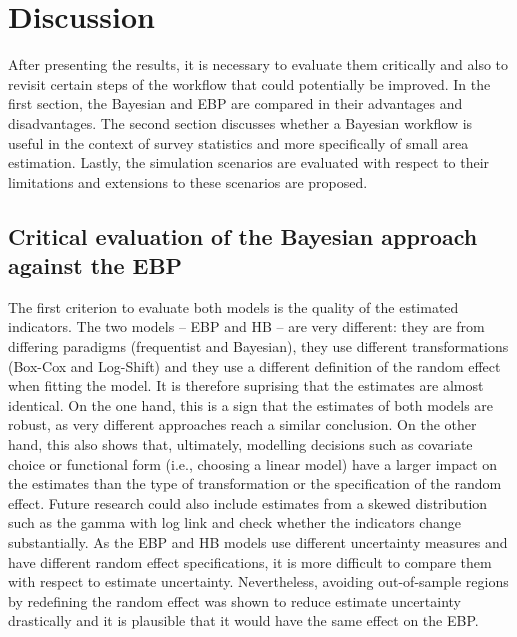 \chapter{Discussion}

After presenting the results, it is necessary to evaluate them critically and also to revisit certain steps of the workflow that could potentially be improved.
In the first section, the Bayesian and EBP are compared in their advantages and disadvantages.
The second section discusses whether a Bayesian workflow is useful in the context of survey statistics and more specifically of small area estimation.
Lastly, the simulation scenarios are evaluated with respect to their limitations and extensions to these scenarios are proposed.


\section{Critical evaluation of the Bayesian approach against the EBP}

The first criterion to evaluate both models is the quality of the estimated indicators.
The two models – EBP and HB – are very different:
they are from differing paradigms (frequentist and Bayesian), they use different transformations (Box-Cox and Log-Shift) and they use a different definition of the random effect when fitting the model.
It is therefore suprising that the estimates are almost identical.
On the one hand, this is a sign that the estimates of both models are robust, as very different approaches reach a similar conclusion.
On the other hand, this also shows that, ultimately, modelling decisions such as covariate choice or functional form (i.e., choosing a linear model) have a larger impact on the estimates than the type of transformation or the specification of the random effect.
Future research could also include estimates from a skewed distribution such as the gamma with log link and check whether the indicators change substantially.
As the EBP and HB models use different uncertainty measures and have different random effect specifications, it is more difficult to compare them with respect to estimate uncertainty.
Nevertheless, avoiding out-of-sample regions by redefining the random effect was shown to reduce estimate uncertainty drastically and it is plausible that it would have the same effect on the EBP.

